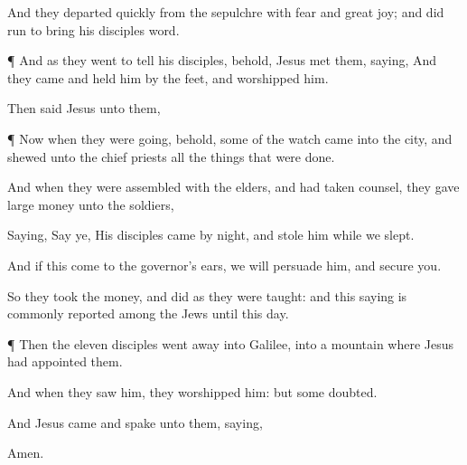 {And they
departed
quickly
from the
sepulchre
with
fear
and
great
joy; and did
run to
bring
his
disciples
word.


\par }{\PP {}¶
And
as they
went to
tell
his
disciples,
behold,
Jesus
met
them,
saying,
{}
And they
came and
held
him by the
feet,
and
worshipped
him.

Then
said
Jesus unto
them,
{}


\par }{\PP {}¶
Now
when
they were
going,
behold,
some of the
watch
came
into the
city, and
shewed unto the chief
priests
all the things that were
done.

And when they were
assembled
with the
elders,
and had
taken
counsel, they
gave
large
money unto the
soldiers,

Saying, Say
ye,
His
disciples
came by
night, and
stole
him
{}
while
we
slept.

And
if
this
come
to the
governor’s
ears,
we will
persuade
him,
and
secure
you.

So
they
took the
money, and
did
as they were
taught:
and
this
saying is commonly
reported
among the
Jews
until this
day.


\par }{\PP {}¶
Then
the
eleven
disciples went
away
into
Galilee,
into a
mountain
where
Jesus had
appointed
them.

And when they
saw
him, they
worshipped
him:
but
some
doubted.

And
Jesus
came and
spake unto
them,
saying,
{}


\par }{\PP {}

Amen.


\par }